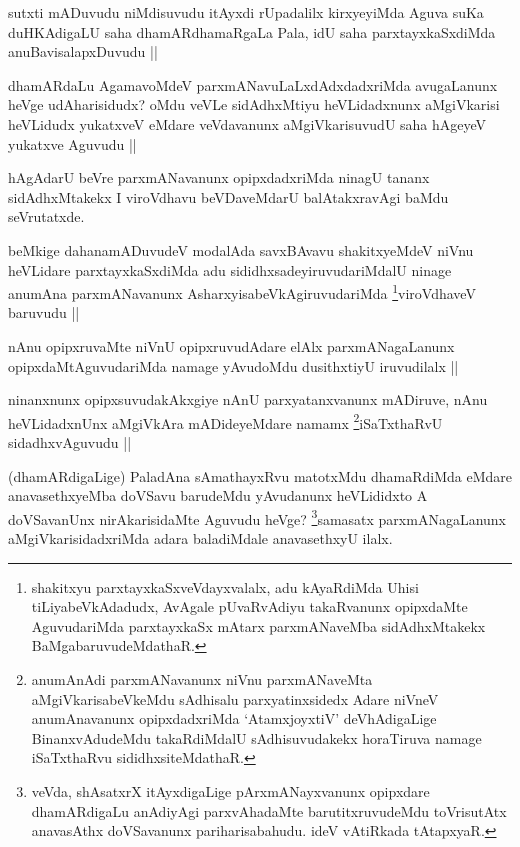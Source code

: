 \begin{artha}
sutxti mADuvudu niMdisuvudu itAyxdi rUpadalilx kirxyeyiMda Aguva suKa duHKAdigaLU saha dhamARdhamaRgaLa Pala, idU saha parxtayxkaSxdiMda anuBavisalapxDuvudu ||
\end{artha}

\begin{artha}
dhamARdaLu AgamavoMdeV parxmANavuLaLxdAdxdadxriMda avugaLanunx heVge udAharisidudx? oMdu veVLe sidAdhxMtiyu heVLidadxnunx aMgiVkarisi heVLidudx yukatxveV eMdare veVdavanunx aMgiVkarisuvudU saha hAgeyeV yukatxve Aguvudu ||
\end{artha}

\begin{artha}
hAgAdarU beVre parxmANavanunx opipxdadxriMda ninagU tananx sidAdhxMtakekx I viroVdhavu beVDaveMdarU balAtakxravAgi baMdu seVrutatxde. 
\end{artha}

\begin{artha}
beMkige dahanamADuvudeV modalAda savxBAvavu shakitxyeMdeV niVnu heVLidare parxtayxkaSxdiMda adu sididhxsadeyiruvudariMdalU ninage anumAna parxmANavanunx AsharxyisabeVkAgiruvudariMda \footnote{shakitxyu parxtayxkaSxveVdayxvalalx, adu kAyaRdiMda Uhisi tiLiyabeVkAdadudx, AvAgale pUvaRvAdiyu takaRvanunx opipxdaMte AguvudariMda parxtayxkaSx mAtarx parxmANaveMba sidAdhxMtakekx BaMgabaruvudeMdathaR.}viroVdhaveV baruvudu ||
\end{artha}

\begin{artha}
nAnu opipxruvaMte niVnU opipxruvudAdare elAlx parxmANagaLanunx opipxdaMtAguvudariMda namage yAvudoMdu dusithxtiyU iruvudilalx ||
\end{artha}

\begin{artha}
ninanxnunx opipxsuvudakAkxgiye nAnU parxyatanxvanunx mADiruve, nAnu heVLidadxnUnx aMgiVkAra mADideyeMdare namamx \footnote{anumAnAdi parxmANavanunx niVnu parxmANaveMta aMgiVkarisabeVkeMdu sAdhisalu parxyatinxsidedx Adare niVneV anumAnavanunx opipxdadxriMda `AtamxjoyxtiV' deVhAdigaLige BinanxvAdudeMdu takaRdiMdalU sAdhisuvudakekx horaTiruva namage iSaTxthaRvu sididhxsiteMdathaR.}iSaTxthaRvU sidadhxvAguvudu ||
\end{artha}

\begin{artha}
(dhamARdigaLige) PaladAna sAmathayxRvu matotxMdu dhamaRdiMda eMdare anavasethxyeMba doVSavu barudeMdu yAvudanunx heVLididxto A doVSavanUnx nirAkarisidaMte Aguvudu heVge? \footnote{veVda, shAsatxrX itAyxdigaLige pArxmANayxvanunx opipxdare dhamARdigaLu anAdiyAgi parxvAhadaMte barutitxruvudeMdu toVrisutAtx anavasAthx doVSavanunx pariharisabahudu. ideV vAtiRkada tAtapxyaR.}samasatx parxmANagaLanunx aMgiVkarisidadxriMda adara baladiMdale anavasethxyU ilalx.
\end{artha}

